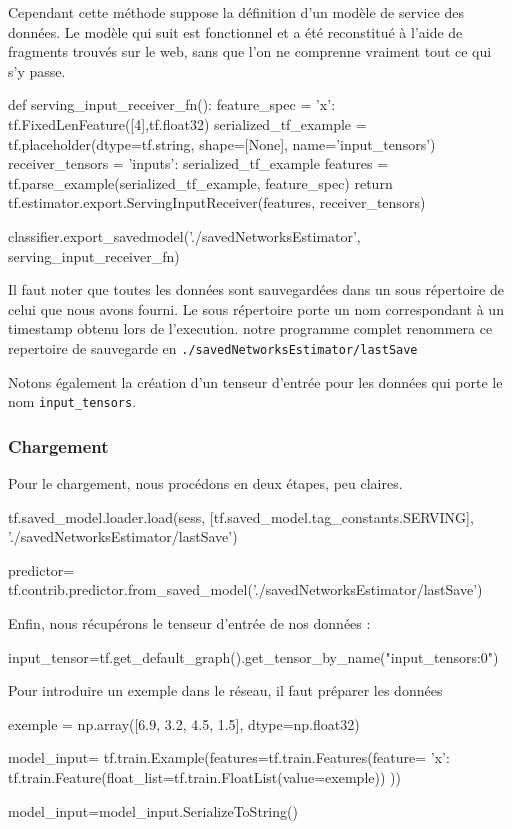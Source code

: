 \documentclass[a4paper,11pt]{book}
\begin{document}
Cependant cette méthode suppose la définition d'un modèle de service des données. 
Le modèle qui suit est fonctionnel et a été reconstitué à l'aide de fragments trouvés sur le web, sans que l'on ne comprenne vraiment tout ce qui s'y passe.

\begin{mypython}
def serving_input_receiver_fn():
  feature_spec = {'x': tf.FixedLenFeature([4],tf.float32)}
  serialized_tf_example = tf.placeholder(dtype=tf.string,
                                         shape=[None],
                                         name='input_tensors')
  receiver_tensors = {'inputs': serialized_tf_example}
  features = tf.parse_example(serialized_tf_example, feature_spec)
  return tf.estimator.export.ServingInputReceiver(features, receiver_tensors)
  
classifier.export_savedmodel('./savedNetworksEstimator', serving_input_receiver_fn)
\end{mypython}

Il faut noter que toutes les données sont sauvegardées dans un sous répertoire de celui que nous avons fourni. Le sous répertoire porte un nom correspondant à un timestamp obtenu lors de l'execution. notre programme complet renommera ce repertoire de sauvegarde en
\verb+./savedNetworksEstimator/lastSave+

Notons également la création d'un tenseur d'entrée pour les données qui porte le nom \verb+input_tensors+.

\subsubsection{Chargement}

Pour le chargement, nous procédons en deux étapes, peu claires.
\begin{mypython}
tf.saved_model.loader.load(sess, [tf.saved_model.tag_constants.SERVING], './savedNetworksEstimator/lastSave')

predictor= tf.contrib.predictor.from_saved_model('./savedNetworksEstimator/lastSave')
\end{mypython}

Enfin, nous récupérons le tenseur d'entrée de nos données :
\begin{mypython}
input_tensor=tf.get_default_graph().get_tensor_by_name("input_tensors:0")
\end{mypython}

Pour introduire un exemple dans le réseau, il faut préparer les données
\begin{mypython}
exemple = np.array([6.9, 3.2, 4.5, 1.5], dtype=np.float32)

model_input= tf.train.Example(features=tf.train.Features(feature={
					'x': tf.train.Feature(float_list=tf.train.FloatList(value=exemple))        
					}))
					
model_input=model_input.SerializeToString()				
\end{mypython}
\end{document}
